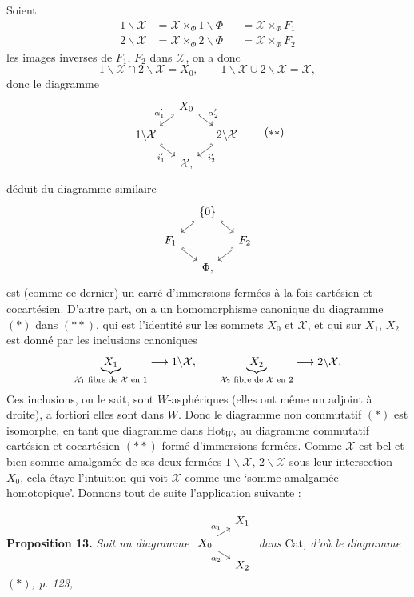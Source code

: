 \documentclass[11pt]{article}
\newcommand{\printedpage}[1]{\marginpar{\footnotesize p.~#1}}
\newcommand{\msp}[1]{\marginpar{\footnotesize [#1]}}
\newcommand{\Hot}{\mathrm{Hot}}
\newcommand{\cX}{\mathcal{X}}
\begin{document}
\printedpage{84}
Soient
\[
\begin{aligned}
1\backslash\cX &= \cX\times_{\Phi} 1\backslash\Phi &&= \cX\times_{\Phi} F_1\\
2\backslash\cX &= \cX\times_{\Phi} 2\backslash\Phi &&= \cX\times_{\Phi} F_2
\end{aligned}
\]
les images inverses de $F_1$, $F_2$ dans $\cX$, on a donc
\[
1\backslash\cX\cap 2\backslash\cX = X_0, \qquad 1\backslash\cX\cup 2\backslash\cX = \cX,
\]
donc le diagramme
\[
\begin{tikzcd}[column sep=small, row sep=small, ampersand replacement=\&]
 \& X_0 \arrow[dl, hook', "\alpha'_1"'] \arrow[dr, hook, "\alpha'_2"] \& \\
1\backslash\cX \arrow[dr, hook, "i'_1"'] \& \& 2\backslash\cX \arrow[dl, hook', "i'_2"] \\
 \& \cX, \&
\end{tikzcd}
\tag*{$(**)$}
\]
déduit du diagramme similaire
\[
\begin{tikzcd}[column sep=small, row sep=small, ampersand replacement=\&]
 \& \{0\} \arrow[dl, hook'] \arrow[dr, hook] \& \\
F_1 \arrow[dr, hook] \& \& F_2 \arrow[dl, hook'] \\
 \& \Phi, \&
\end{tikzcd}
\]
est (comme ce dernier) un carré d'immersions fermées à la fois cartésien et cocartésien. D'autre part, on a un homomorphisme
\msp{page 125}
canonique du diagramme $(*)$ dans $(**)$, qui est l'identité sur les sommets $X_0$ et $\cX$, et qui sur $X_1$, $X_2$ est donné par les inclusions canoniques
\[
\underbrace{X_1}_{\text{\scriptsize $\cX_1$ fibre de $\cX$ en 1}} \longrightarrow 1\backslash\cX, \qquad
\underbrace{X_2}_{\text{\scriptsize $\cX_2$ fibre de $\cX$ en 2}} \longrightarrow 2\backslash\cX.
\]
Ces inclusions, on le sait, sont $W$-asphériques (elles ont même un adjoint à droite), a fortiori elles sont dans $W$. Donc le diagramme non commutatif $(*)$ est isomorphe, en tant que diagramme dans $\Hot_W$, au diagramme commutatif cartésien et cocartésien $(**)$ formé d'immersions fermées. Comme $\cX$ est bel et bien somme amalgamée de ses deux fermées %
$1\backslash\cX$, $2\backslash\cX$ sous leur intersection $X_0$, cela étaye l'intuition qui voit $\cX$ comme une `somme amalgamée homotopique'. Donnons tout de suite l'application suivante :

\textbf{Proposition 13.} \textit{Soit un diagramme} $\begin{tikzcd}[column sep=small, row sep=tiny, ampersand replacement=\&, baseline=(\tikzcdmatrixname-2-1.base)]
 \& X_1 \\
X_0 \arrow[ur, "\alpha_1"] \arrow[dr, "\alpha_2"'] \& \\
 \& X_2
\end{tikzcd}$ \textit{dans} Cat\textit{, d'où le diagramme} $(*)$\textit{, p. 123,}
\end{document}

